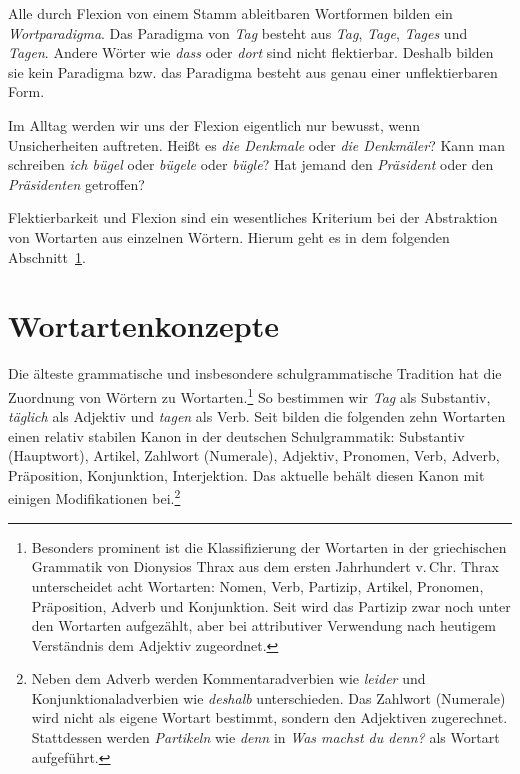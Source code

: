 Alle durch Flexion von einem Stamm ableitbaren Wortformen bilden ein \textit{Wortparadigma}. Das Paradigma von \textit{Tag} besteht aus \textit{Tag}, \textit{Tage}, \textit{Tages} und \textit{Tagen}. Andere Wörter wie \textit{dass} oder \textit{dort} sind nicht flektierbar. Deshalb bilden sie kein Paradigma bzw. das Paradigma besteht aus genau einer unflektierbaren Form. 

Im Alltag werden wir uns der Flexion eigentlich nur bewusst, wenn Unsicherheiten auftreten. Heißt es \textit{die Denkmale} oder \textit{die Denkmäler}? Kann man schreiben \textit{ich bügel} oder \textit{bügele} oder \textit{bügle}? Hat jemand den \textit{Präsident} oder den \textit{Präsidenten} getroffen? 

Flektierbarkeit und Flexion sind ein wesentliches Kriterium bei der Abstraktion von Wortarten aus einzelnen Wörtern. Hierum geht es in dem folgenden Abschnitt~\ref{section:Wortarten}.
 
 
\section{Wortartenkonzepte}\label{section:Wortarten}

Die älteste grammatische und insbesondere schulgrammatische Tradition hat die Zuordnung von Wörtern zu Wortarten.\footnote{Besonders prominent ist die Klassifizierung der Wortarten in der griechischen Grammatik von Dionysios Thrax aus dem ersten Jahrhundert v.\,Chr. Thrax unterscheidet acht Wortarten: Nomen, Verb, Partizip, Artikel, Pronomen, Präposition, Adverb und Konjunktion. Seit \citet[278]{Adelung1782} wird das Partizip zwar noch unter den Wortarten aufgezählt, aber bei attributiver Verwendung nach heutigem Verständnis dem Adjektiv zugeordnet.} So bestimmen wir \textit{Tag} als Substantiv, \textit{täglich} als Adjektiv und \textit{tagen} als Verb. Seit \citet[71--79]{Adelung1782} bilden die folgenden zehn Wortarten einen relativ stabilen Kanon in der deutschen Schulgrammatik: Substantiv (Hauptwort), Artikel, Zahlwort (Numerale), Adjektiv, Pronomen, Verb, Adverb, Präposition, Konjunktion, Interjektion. Das aktuelle \citet[13--17]{KMK2019} behält diesen Kanon mit einigen Modifikationen bei.\footnote{Neben dem Adverb werden Kommentaradverbien wie \textit{leider} und Konjunktionaladverbien wie \textit{deshalb} unterschieden. Das Zahlwort (Numerale) wird nicht als eigene Wortart bestimmt, sondern den Adjektiven zugerechnet. Stattdessen werden \textit{Partikeln} wie \textit{denn} in \textit{Was machst du denn?} als Wortart aufgeführt.}

